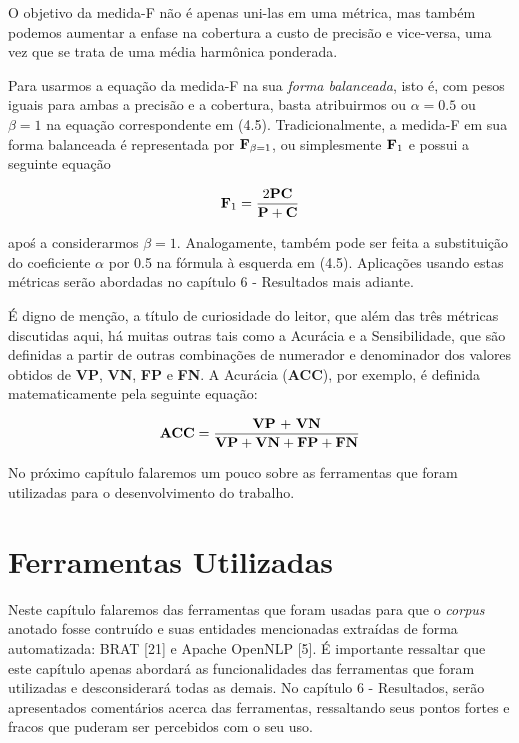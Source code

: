 \documentclass[11pt]{report}
\begin{document}
O objetivo da medida-F não é apenas uni-las em uma métrica, mas também podemos aumentar a enfase na cobertura a custo de precisão e vice-versa, uma vez que se trata de uma média harmônica ponderada.

Para usarmos a equação da medida-F na sua \textit{forma balanceada}, isto é, com pesos iguais para ambas a precisão e a cobertura, basta atribuirmos ou $\alpha = 0.5$ ou  $\beta = 1$ na equação correspondente em (4.5). Tradicionalmente, a medida-F em sua forma balanceada é representada por $\text{\textbf{F}}_{\beta = 1}$, ou simplesmente $\text{\textbf{F}}_{1}$ e possui
a seguinte equação

\begin{equation}
 \text{\textbf{F}}_1 = \dfrac{2\text{\textbf{PC}}}{\text{\textbf{P}} + \text{\textbf{C}}}
\end{equation}

apoś a considerarmos $\beta = 1$. Analogamente, também pode ser feita a substituição do coeficiente $\alpha$ por 0.5 na fórmula à esquerda em (4.5).
Aplicações usando estas métricas serão abordadas no capítulo 6 - Resultados mais adiante.

É digno de menção, a título de curiosidade do leitor, que além das três métricas discutidas aqui, há muitas outras tais como a Acurácia e a Sensibilidade, que são definidas
a partir de outras combinações de numerador e denominador dos valores obtidos de \textbf{VP}, \textbf{VN}, \textbf{FP} e \textbf{FN}. A Acurácia (\textbf{ACC}), por exemplo, é
definida matematicamente pela seguinte equação:

\begin{equation}
 \text{\textbf{ACC}} = \dfrac{\text{\textbf{VP} + \textbf{VN}}}{\text{\textbf{VP}} + \text{\textbf{VN}} + \text{\textbf{FP}} + \text{\textbf{FN}}}
\end{equation}

No próximo capítulo falaremos um pouco sobre as ferramentas que foram utilizadas para o desenvolvimento do trabalho.

\pagebreak
\chapter{Ferramentas Utilizadas}

\indent\indent Neste capítulo falaremos das ferramentas que foram usadas para que o \textit{corpus} anotado fosse contruído e suas entidades mencionadas extraídas
de forma automatizada: BRAT [21] e Apache OpenNLP [5]. É importante ressaltar que este capítulo apenas abordará as funcionalidades das ferramentas que foram utilizadas e desconsiderará todas as
demais. No capítulo 6 - Resultados, serão apresentados comentários acerca das ferramentas, ressaltando seus pontos fortes e fracos que puderam ser percebidos com o  seu uso.
\end{document}
